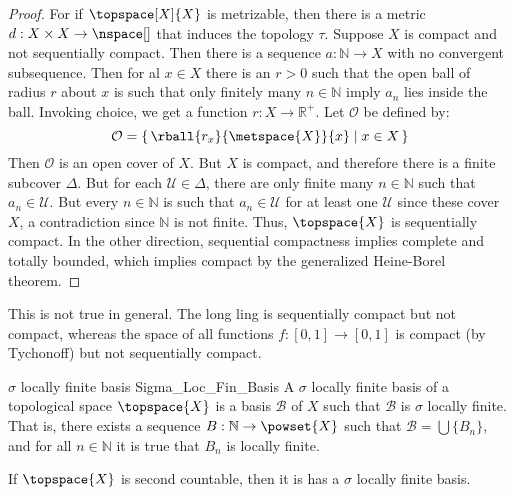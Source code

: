 \documentclass{article}                                                        %
\begin{document}
        \begin{proof}
            For if $\topspace[X]{X}$ is metrizable, then there is a metric
            $d:X\times{X}\rightarrow\nspace[]$ that induces the topology $\tau$.
            Suppose $X$ is compact and not sequentially compact. Then there is a
            sequence $a:\mathbb{N}\rightarrow{X}$ with no convergent
            subsequence. Then for al $x\in{X}$ there is an $r>0$ such that the
            open ball of radius $r$ about $x$ is such that only finitely many
            $n\in\mathbb{N}$ imply $a_{n}$ lies inside the ball. Invoking
            choice, we get a function $r:X\rightarrow\mathbb{R}^{+}$. Let
            $\mathcal{O}$ be defined by:
            \begin{equation}
                \mathcal{O}=\{\,\rball{r_{x}}{\metspace{X}}{x}\;|\;x\in{X}\,\}
            \end{equation}
            Then $\mathcal{O}$ is an open cover of $X$. But $X$ is compact, and
            therefore there is a finite subcover $\Delta$. But for each
            $\mathcal{U}\in\Delta$, there are only finite many
            $n\in\mathbb{N}$ such that $a_{n}\in\mathcal{U}$. But every
            $n\in\mathbb{N}$ is such that $a_{n}\in\mathcal{U}$ for at least
            one $\mathcal{U}$ since these cover $X$, a contradiction since
            $\mathbb{N}$ is not finite. Thus, $\topspace{X}$ is sequentially
            compact. In the other direction, sequential compactness implies
            complete and totally bounded, which implies compact by the
            generalized Heine-Borel theorem.
        \end{proof}
        This is not true in general. The long ling is sequentially compact but
        not compact, whereas the space of all functions
        $f:[0,1]\rightarrow[0,1]$ is compact (by Tychonoff) but not sequentially
        compact.
        \begin{fdefinition}{$\sigma$ locally finite basis}
                           {Sigma_Loc_Fin_Basis}
            A $\sigma$ locally finite basis of a topological space
            $\topspace{X}$ is a basis $\mathcal{B}$ of $X$ such that
            $\mathcal{B}$ is $\sigma$ locally finite. That is, there exists
            a sequence $B:\mathbb{N}\rightarrow\powset{X}$ such that
            $\mathcal{B}=\bigcup\{B_{n}\}$, and for all $n\in\mathbb{N}$ it is
            true that $B_{n}$ is locally finite.
        \end{fdefinition}
        \begin{theorem}
            \label{thm:Second_Countable_Implies_Sigma_Loc_Fin_Basis}%
            If $\topspace{X}$ is second countable, then it is has a $\sigma$
            locally finite basis.
        \end{theorem}
\end{document}
